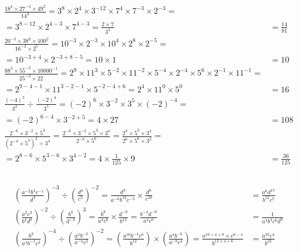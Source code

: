 \documentclass[a4paper,12pt]{article}
\begin{document}
\subsection{} %

\begin{align*}
\frac{18^4 \times 27^{-4} \times 49^2}{14^3} 
= 3^8 \times 2^4 \times 3^{-12} \times 7^4 \times 7^{-3} \times 2^{-3}= \\[6pt] 
= 3^{8 - 12} \times 2^{4 - 3} \times 7^{4 - 3}
= \frac{2 \times 7}{3^4} 
&= \frac{14}{81} \\[6pt]
\frac{20^{-3} \times 38^0 \times 100^2}{16^{-2} \times 2^5} 
= 10^{-3} \times 2^{-3} \times 10^4 \times 2^8 \times 2^{-5}= \\[6pt] 
= 10^{-3 + 4} \times 2^{-3 + 8 - 5}
= 10 \times 1 
&= 10 \\[6pt]
\frac{88^3 \times 55^{-2} \times 10000^{-1}}{25^{-3} \times 22} 
= 2^9 \times 11^3 \times 5^{-2} \times 11^{-2} \times 5^{-4} \times 2^{-4} \times 5^6 \times 2^{-1} \times 11^{-1}= \\[6pt]
= 2^{9 - 4 - 1} \times 11^{3 - 2 - 1} \times 5^{-2 - 4 + 6}
= 2^4 \times 11^0 \times 5^0
&= 16 \\[6pt]
\frac{(-4)^3}{3^2} \div \frac{(-2)^4}{3^5}
= (-2)^6 \times 3^{-2} \times 3^5 \times (-2)^{-4}= \\[6pt]
= (-2)^{6 - 4} \times 3^{-2 + 5} 
= 4 \times 27
&= 108  \\[6pt]
\frac{2^{-6} \times 3^{-2} \times 5^3}{(2^{-4} \times 5^3)^2 \div 3^4}
= \frac{2^{-6} \times 3^{-2} \times 5^3 \times 3^4}{2^{-8} \times 5^6}
= \frac{2^8 \times 5^3 \times 3^4}{2^6 \times 5^6 \times 3^2} = \\[6pt]
= 2^{8 - 6} \times 5^{3 - 6} \times 3^{4 - 2}
= 4 \times \frac{1}{125} \times 9
&= \frac{36}{125}
\end{align*}

\subsection{} %

\begin{align*}
\left( \frac{a^{-2}b^4c^{-1}}{d^3} \right)^{-3} \div \left( \frac{d^4}{c^5} \right)^{-2} 
= \frac{d^9}{a^{-6}b^{12}c^{-3}} \times \frac{d^8}{c^{10}}
&= \frac{a^6 d^{17}}{b^{12} c^7} \\[6pt]
\left( \frac{a^2 c^3}{b^4 d^0} \right)^{-2} \div \left( \frac{b^4}{d^{-3}} \right)^3
= \frac{b^8}{a^4 c^6} \times \frac{d^{-9}}{b^{12}}
= \frac{b^{-4} d^{-9}}{a^4 c^6}
&= \frac{1}{a^4 b^4 c^6 d^9} \\[6pt]
\left( \frac{b^3}{a^4b^{-1}c^2} \right)^{-4} \div \left( \frac{a^2b^{-3}}{a^{-4}c^2} \right)^{-2}
= \left( \frac{a^{16}b^{-4}c^8}{b^{12}} \right) \times \left( \frac{a^4b^{-6}}{a^{-8}c^4} \right)
= \frac{a^{16 + 4 + 8} \times c^{8 - 4}}{b^{12 + 4 + 6}}
&= \frac{a^{28}c^4}{b^{22}}
\end{align*}
\end{document}
